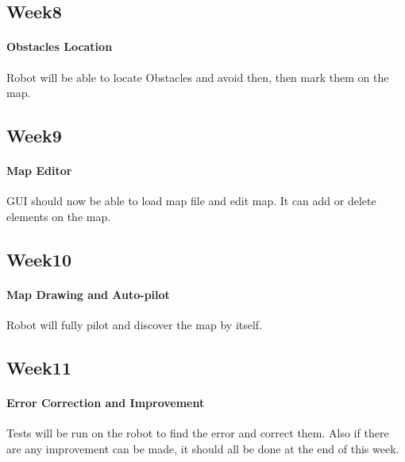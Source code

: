 \documentclass[11pt, a4paper]{report}
\begin{document}
\subsection{Week8}
\paragraph{Obstacles Location}
Robot will be able to locate Obstacles and avoid then, then mark them on the map.


\subsection{Week9}
\paragraph{Map Editor}
GUI should now be able to load map file and edit map. It can add or delete elements on the map.




\subsection{Week10}
\paragraph{Map Drawing and Auto-pilot}
Robot will fully pilot and discover the map by itself.


\subsection{Week11}
\paragraph{Error Correction and Improvement}
Tests will be run on the robot to find the error and correct them. Also if there are any improvement can be made, it should all be done at the end of this week.
\end{document}
